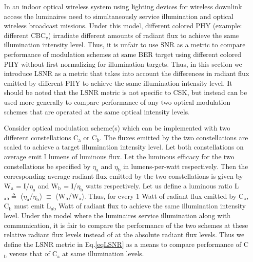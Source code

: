 In an indoor optical wireless system using lighting devices for wireless downlink access the luminaires need to simultaneously service illumination and optical wireless broadcast missions. Under this model, different colored PHY (example: different CBC$_{v}$) irradiate different amounts of radiant flux to achieve the same illumination intensity level. Thus, it is unfair to use SNR as a metric to compare performance of modulation schemes at same BER target using different colored PHY without first normalizing for illumination targets. Thus, in this section we introduce LSNR as a metric that takes into account the differences in radiant flux emitted by different PHY to achieve the same illumination intensity level. It should be noted that the LSNR metric is not specific to CSK, but instead can be used more generally to compare performance of any two optical modulation schemes that are operated at the same optical intensity levels.

Consider optical modulation scheme(s) which can be implemented with two different constellations C$_{\text{a}}$ or C$_{\text{b}}$. The fluxes emitted by the two constellations are scaled to achieve a target illumination intensity level. Let both constellations on average emit I lumens of luminous flux. Let the luminous efficacy for the two constellations be specified by $\eta_{\text{a}}$ and $\eta_{\text{b}}$ in lumens-per-watt respectively. Then the corresponding average radiant flux emitted by the two constellations is given by W$_{\text{a}}$ = I/$\eta_{\text{a}}$ and W$_{\text{b}}$  = I/$\eta_{\text{b}}$ watts respectively. Let us define a luminous ratio L$_{\text{ab}}\triangleq$ ($\eta_{\text{a}}/\eta_{\text{b}}$) $\equiv$ (W$_{\text{b}}$/W$_{\text{a}}$). Thus, for every 1 Watt of radiant flux emitted by C$_{\text{a}}$, C$_{\text{b}}$ must emit L$_{\text{ab}}$ Watt of radiant flux to achieve the same illumination intensity level. Under the model where the luminaires service illumination along with communication, it is fair to compare the performance of the two schemes at these relative radiant flux levels instead of at the absolute radiant flux levels. Thus we define the LSNR metric in Eq.\eqref{eqLSNR} as a means to compare performance of C$_{\text{b}}$ versus that of C$_{\text{a}}$ at same illumination levels. 

